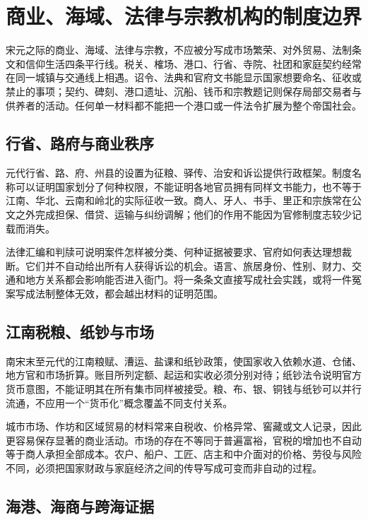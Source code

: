 \section{商业、海域、法律与宗教机构的制度边界}
\label{sec:yuan-commerce-seas-law-religion}

宋元之际的商业、海域、法律与宗教，不应被分写成市场繁荣、对外贸易、法制条文和信仰生活四条平行线。税关、榷场、港口、行省、寺院、社团和家庭契约经常在同一城镇与交通线上相遇。诏令、法典和官府文书能显示国家想要命名、征收或禁止的事项；契约、碑刻、港口遗址、沉船、钱币和宗教题记则保存局部交易者与供养者的活动。任何单一材料都不能把一个港口或一件法令扩展为整个帝国社会。

\subsection{行省、路府与商业秩序}

元代行省、路、府、州县的设置为征粮、驿传、治安和诉讼提供行政框架。制度名称可以证明国家划分了何种权限，不能证明各地官员拥有同样文书能力，也不等于江南、华北、云南和岭北的实际征收一致。商人、牙人、书手、里正和宗族常在公文之外完成担保、借贷、运输与纠纷调解；他们的作用不能因为官修制度志较少记载而消失。

法律汇编和判牍可说明案件怎样被分类、何种证据被要求、官府如何表达理想裁断。它们并不自动给出所有人获得诉讼的机会。语言、旅居身份、性别、财力、交通和地方关系都会影响能否进入衙门。将一条条文直接写成社会实践，或将一件冤案写成法制整体无效，都会越出材料的证明范围。

\subsection{江南税粮、纸钞与市场}

南宋末至元代的江南粮赋、漕运、盐课和纸钞政策，使国家收入依赖水道、仓储、地方官和市场折算。账目所列定额、起运和实收必须分别对待；纸钞法令说明官方货币意图，不能证明其在所有集市同样被接受。粮、布、银、铜钱与纸钞可以并行流通，不应用一个“货币化”概念覆盖不同支付关系。

城市市场、作坊和区域贸易的材料常来自税收、价格异常、窖藏或文人记录，因此更容易保存显著的商业活动。市场的存在不等同于普遍富裕，官税的增加也不自动等于商人承担全部成本。农户、船户、工匠、店主和中介面对的价格、劳役与风险不同，必须把国家财政与家庭经济之间的传导写成可变而非自动的过程。

\subsection{海港、海商与跨海证据}

